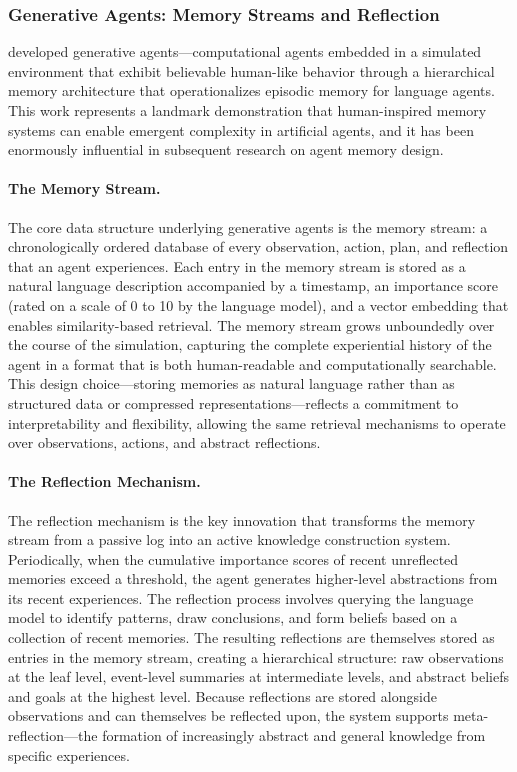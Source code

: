 \subsubsection{Generative Agents: Memory Streams and Reflection}

\citet{park2023generative} developed generative agents---computational agents embedded in a simulated environment that exhibit believable human-like behavior through a hierarchical memory architecture that operationalizes episodic memory for language agents. This work represents a landmark demonstration that human-inspired memory systems can enable emergent complexity in artificial agents, and it has been enormously influential in subsequent research on agent memory design.

\paragraph{The Memory Stream.} The core data structure underlying generative agents is the memory stream: a chronologically ordered database of every observation, action, plan, and reflection that an agent experiences. Each entry in the memory stream is stored as a natural language description accompanied by a timestamp, an importance score (rated on a scale of 0 to 10 by the language model), and a vector embedding that enables similarity-based retrieval. The memory stream grows unboundedly over the course of the simulation, capturing the complete experiential history of the agent in a format that is both human-readable and computationally searchable. This design choice---storing memories as natural language rather than as structured data or compressed representations---reflects a commitment to interpretability and flexibility, allowing the same retrieval mechanisms to operate over observations, actions, and abstract reflections.

\paragraph{The Reflection Mechanism.} The reflection mechanism is the key innovation that transforms the memory stream from a passive log into an active knowledge construction system. Periodically, when the cumulative importance scores of recent unreflected memories exceed a threshold, the agent generates higher-level abstractions from its recent experiences. The reflection process involves querying the language model to identify patterns, draw conclusions, and form beliefs based on a collection of recent memories. The resulting reflections are themselves stored as entries in the memory stream, creating a hierarchical structure: raw observations at the leaf level, event-level summaries at intermediate levels, and abstract beliefs and goals at the highest level. Because reflections are stored alongside observations and can themselves be reflected upon, the system supports meta-reflection---the formation of increasingly abstract and general knowledge from specific experiences.

